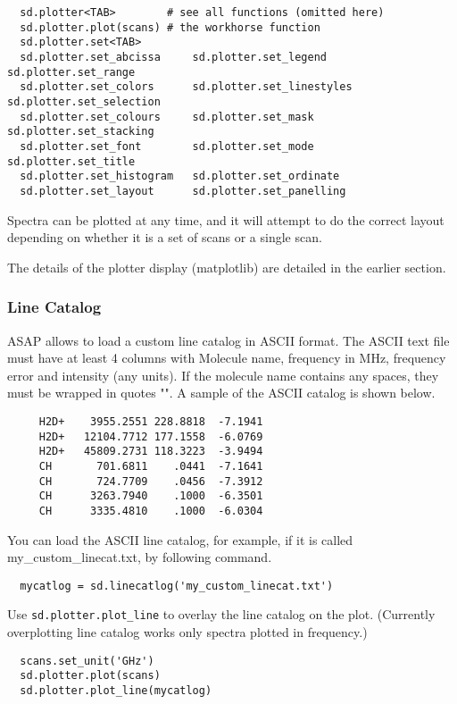 \small
\begin{verbatim}
  sd.plotter<TAB>        # see all functions (omitted here)
  sd.plotter.plot(scans) # the workhorse function
  sd.plotter.set<TAB>
  sd.plotter.set_abcissa     sd.plotter.set_legend      sd.plotter.set_range
  sd.plotter.set_colors      sd.plotter.set_linestyles  sd.plotter.set_selection
  sd.plotter.set_colours     sd.plotter.set_mask        sd.plotter.set_stacking
  sd.plotter.set_font        sd.plotter.set_mode        sd.plotter.set_title
  sd.plotter.set_histogram   sd.plotter.set_ordinate    
  sd.plotter.set_layout      sd.plotter.set_panelling   
\end{verbatim}
\normalsize


Spectra can be plotted at any time, and it will attempt to do the
correct layout depending on whether it is a set of scans or a single
scan. 

The details of the plotter display (matplotlib) are detailed in the
earlier section. 

\subsubsection{Line Catalog}
ASAP allows to load a custom line catalog in ASCII format.
The ASCII text file must have at least 4 columns with Molecule name, 
frequency in MHz, frequency error and intensity (any units).
If the molecule name contains any spaces, they must be wrapped in quotes "".
A sample of the ASCII catalog is shown below.

\small
\begin{verbatim}
     H2D+    3955.2551 228.8818  -7.1941  
     H2D+   12104.7712 177.1558  -6.0769  
     H2D+   45809.2731 118.3223  -3.9494  
     CH       701.6811    .0441  -7.1641  
     CH       724.7709    .0456  -7.3912  
     CH      3263.7940    .1000  -6.3501  
     CH      3335.4810    .1000  -6.0304
\end{verbatim}
\normalsize
You can load the ASCII line catalog, for example, if
it is called my\_custom\_linecat.txt,
by following command.

\small
\begin{verbatim}
  mycatlog = sd.linecatlog('my_custom_linecat.txt')
\end{verbatim}
\normalsize

Use {\tt sd.plotter.plot\_line} to overlay the line catalog on 
the plot. (Currently overplotting line catalog works only spectra plotted
in frequency.)

\small
\begin{verbatim}
  scans.set_unit('GHz')
  sd.plotter.plot(scans)
  sd.plotter.plot_line(mycatlog)
\end{verbatim}
\normalsize


